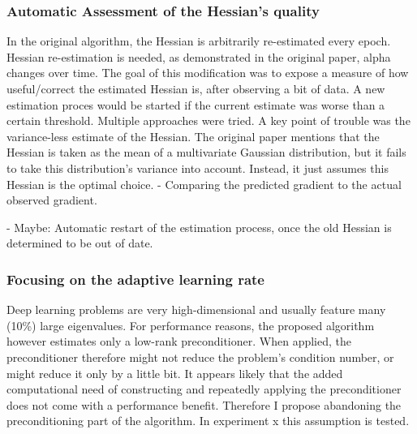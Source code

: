 \documentclass[twoside,12pt,a4paper]{report}
\begin{document}
\subsubsection{Automatic Assessment of the Hessian's quality}
In the original algorithm, the Hessian is arbitrarily re-estimated every epoch. Hessian re-estimation is needed, as demonstrated in the original paper, alpha changes over time. The goal of this modification was to expose a measure of how useful/correct the estimated Hessian is, after observing a bit of data. A new estimation proces would be started if the current estimate was worse than a certain threshold. Multiple approaches were tried. A key point of trouble was the variance-less estimate of the Hessian. The original paper mentions that the Hessian is taken as the mean of a multivariate Gaussian distribution, but it fails to take this distribution's variance into account. Instead, it just assumes this Hessian is the optimal choice. 
- Comparing the predicted gradient to the actual observed gradient.

- Maybe: Automatic restart of the estimation process, once the old Hessian is determined to be out of date.

\subsubsection{Focusing on the adaptive learning rate}
Deep learning problems are very high-dimensional and usually feature many (10\%) 
large eigenvalues. For performance reasons, the proposed algorithm however estimates only a low-rank preconditioner. When applied, the preconditioner therefore might not reduce the problem's condition number, or might reduce it only by a little bit. It appears likely that the added computational need of constructing and repeatedly applying the preconditioner does not come with a performance benefit. Therefore I propose abandoning the preconditioning part of the algorithm. In experiment x  this assumption is tested.
\end{document}
